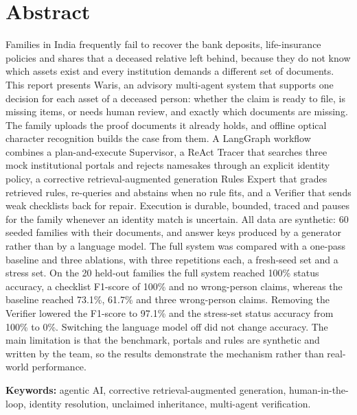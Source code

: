 \documentclass[12pt,a4paper,oneside]{report}
\begin{document}
\chapter*{Abstract}
\thispagestyle{frontmatter}
Families in India frequently fail to recover the bank deposits, life-insurance policies and shares that a deceased relative left behind, because they do not know which assets exist and every institution demands a different set of documents. This report presents Waris, an advisory multi-agent system that supports one decision for each asset of a deceased person: whether the claim is ready to file, is missing items, or needs human review, and exactly which documents are missing. The family uploads the proof documents it already holds, and offline optical character recognition builds the case from them. A LangGraph workflow combines a plan-and-execute Supervisor, a ReAct Tracer that searches three mock institutional portals and rejects namesakes through an explicit identity policy, a corrective retrieval-augmented generation Rules Expert that grades retrieved rules, re-queries and abstains when no rule fits, and a Verifier that sends weak checklists back for repair. Execution is durable, bounded, traced and pauses for the family whenever an identity match is uncertain. All data are synthetic: 60 seeded families with their documents, and answer keys produced by a generator rather than by a language model. The full system was compared with a one-pass baseline and three ablations, with three repetitions each, a fresh-seed set and a stress set. On the 20 held-out families the full system reached 100\% status accuracy, a checklist F1-score of 100\% and no wrong-person claims, whereas the baseline reached 73.1\%, 61.7\% and three wrong-person claims. Removing the Verifier lowered the F1-score to 97.1\% and the stress-set status accuracy from 100\% to 0\%. Switching the language model off did not change accuracy. The main limitation is that the benchmark, portals and rules are synthetic and written by the team, so the results demonstrate the mechanism rather than real-world performance.

\medskip
\noindent\textbf{Keywords:} agentic AI, corrective retrieval-augmented generation, human-in-the-loop, identity resolution, unclaimed inheritance, multi-agent verification.

\tableofcontents
\clearpage{}
\listoffigures
\clearpage{}
\listoftables
\end{document}
